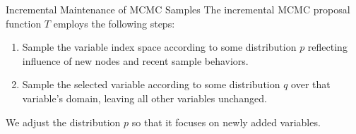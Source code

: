 \documentclass[onlymath,xcolor=pdftex,dvipsnames,table]{beamer}
\newcommand{\felix}{\textsc{Felix}\xspace}
\newcommand{\head}[1]{{\large\color{OliveGreen}#1\\[2pt]}}
\begin{document}
\begin{frame}{Incremental Maintenance of MCMC Samples}
The incremental MCMC proposal function $T$ employs the following steps:
\begin{enumerate}
  \item Sample the variable index space according to some distribution $p$ reflecting influence of new nodes and recent sample behaviors.
  \item Sample the selected variable according to some distribution $q$ over that variable's domain, leaving all other variables unchanged.
\end{enumerate}
We adjust the distribution $p$ so that it focuses on newly added variables.
\end{frame}






\end{document}
